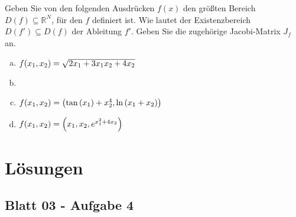 \documentclass{scrreprt}
\begin{document}
Geben Sie von den folgenden Ausdrücken $f(x)$ den größten Bereich
$D(f) \subseteq \mathbb{R}^N$, für den $f$ definiert ist.
Wie lautet der Existenzbereich $D(f') \subseteq D(f)$ der Ableitung $f'$.
Geben Sie die zugehörige Jacobi-Matrix $J_f$ an.
\begin{enumerate}[a)]
\item $f\qty(x_1, x_2) = \sqrt{2x_1 + 3x_1x_2 + 4x_2}$
\item
\item $f\qty(x_1, x_2) = \qty(\tan\qty(x_1) + x_2^4, \ln\qty(x_1 + x_2))$
\item $f\qty(x_1, x_2) = \qty(x_1, x_2, e^{x_1^2 + 4 x_2})$
\end{enumerate}


\chapter{Lösungen}

\section{Blatt 03 - Aufgabe 4}
\end{document}
